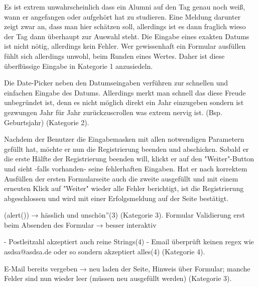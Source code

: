 {Es ist extrem unwahrscheinlich dass ein Alumni auf den Tag genau noch weiß, wann er angefangen oder aufgehört hat zu studieren. 
Eine Meldung darunter zeigt zwar an, dass man hier schätzen soll, allerdings ist es dann fraglich wieso der Tag dann überhaupt zur Auswahl steht.
}
{Die Eingabe eines exakten Datums ist nicht nötig, allerdings kein Fehler. Wer gewissenhaft ein Formular ausfüllen fühlt sich allerdings unwohl, beim Runden eines
Wertes. Daher ist diese überflüssige Eingabe in Kategorie 1 anzusiedeln.
}
{
} 

{
Die Date-Picker neben den Datumseingaben verführen zur schnellen und einfachen Eingabe des Datums. Allerdings
merkt man schnell das diese Freude unbegründet ist, denn es nicht möglich direkt ein Jahr einzugeben sondern ist gezwungen Jahr für
Jahr zurückzuscrollen was extrem nervig ist. (Bsp. Geburtsjahr)
}
{  (Kategorie 2).
}
{
}





Nachdem der Benutzer die Eingabemasken mit allen notwendigen Parametern gefüllt hat, möchte er nun die Registrierung beenden und abschicken. Sobald
er die erste Hälfte der Registrierung beenden will, klickt er auf den "Weiter"-Button und sieht -falls vorhanden- seine fehlerhaften Eingaben. Hat er nach korrektem
Ausfüllen der ersten Formularseite auch die zweite ausgefüllt und mit einem erneuten Klick auf "Weiter" wieder alle Fehler berichtigt, ist die Registrierung abgeschlossen
und wird mit einer Erfolgsmeldung auf der Seite bestätigt.

{
(alert()) → hässlich und unschön”(3)
}
{  (Kategorie 3).
}
{
Formular Validierung erst beim Absenden des Formular → besser interaktiv
}

{
	- Postleitzahl akzeptiert auch reine Strings(4)
	- Email überprüft keinen regex wie asdsa@asdsa.de oder so sondern akzeptiert alles(4)
}
{  (Kategorie 4).}
{
} 

{
E-Mail bereits vergeben → neu laden der Seite, Hinweis über Formular; manche Felder sind nun wieder leer (müssen neu ausgefüllt werden)
}
{  (Kategorie 3).
}
{
}  
